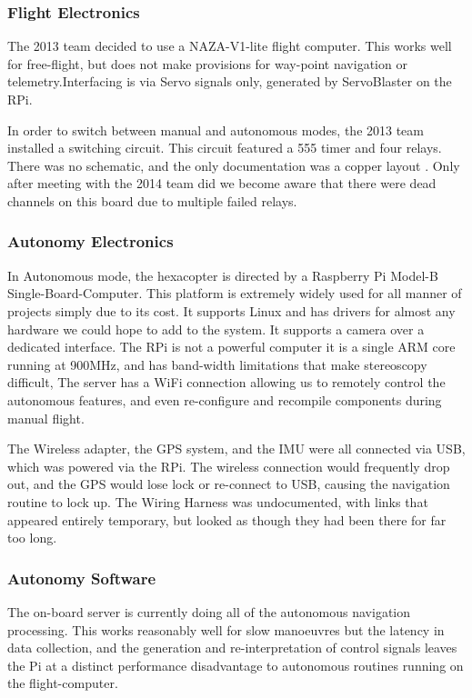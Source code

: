 \documentclass[a4paper, 11pt, titlepage]{article}
\begin{document}
    \subsubsection{Flight Electronics}
      The 2013 team  decided to use a NAZA-V1-lite flight computer.  This works well for free-flight, but does not make provisions for way-point navigation or telemetry.Interfacing is via Servo signals only, generated by ServoBlaster \cite{ServoBlaster} on the RPi.

      In order to switch between manual and autonomous modes, the 2013 team installed a switching circuit. This circuit featured a 555 timer and four relays.
      There was no schematic, and the only documentation was a copper layout \cite[p. 27-28]{OConnor}.  Only after meeting with the 2014 team did we become aware that there were dead channels on this board due to multiple failed relays.

    \subsubsection{Autonomy Electronics}
      In Autonomous mode, the hexacopter is directed by a Raspberry Pi Model-B Single-Board-Computer.
      This platform is extremely widely used for all manner of projects simply due to its cost.
      It supports Linux and has drivers for almost any hardware we could hope to add to the system. It supports a camera over a dedicated interface.
      The RPi is not a powerful computer it is a single ARM core running at 900MHz, and has band-width limitations that make stereoscopy difficult, 
      The server has a WiFi connection allowing us to remotely control the autonomous features, and even re-configure and recompile components during manual flight.

      The Wireless adapter, the GPS system, and the IMU were all connected via USB, which was powered via the RPi.  The wireless connection would frequently drop out, and the GPS would lose lock or re-connect to USB, causing the navigation routine to lock up.
      The Wiring Harness was undocumented, with links that appeared entirely temporary, but looked as though they had been there for far too long.

    \subsubsection{Autonomy Software}
      The on-board server is currently doing all of the autonomous navigation processing.  This works reasonably well for slow manoeuvres but the latency in data collection, and the generation and re-interpretation of control signals leaves the Pi at a distinct performance disadvantage to autonomous routines running on the flight-computer.
\end{document}

